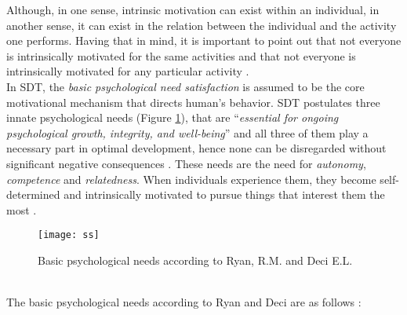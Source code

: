 Although, in one sense, intrinsic motivation can exist within an individual, in another sense, it can exist in the relation between the individual and the activity one performs. Having that in mind, it is important to point out that not everyone is intrinsically motivated for the same activities and that not everyone is intrinsically motivated for any particular activity \cite{ryan2000intrinsic}. \\In SDT, the \textit{basic psychological need satisfaction} is assumed to be the core motivational mechanism that directs human's behavior. SDT postulates three innate psychological needs (Figure \ref{fig:ss}), that are ``\textit{essential for ongoing psychological growth, integrity, and well-being}'' and all three of them play a necessary part in optimal development, hence none can be disregarded without significant negative consequences \cite{deci2000and}. These needs are the need for \textit{autonomy}, \textit{competence} and \textit{relatedness}. When individuals experience them, they become self-determined and intrinsically motivated to pursue things that interest them the most \cite{deci2000and}.\\
\begin{figure}[h]
    \centering
    \texttt{[image: ss]}
    \caption{Basic psychological needs according to Ryan, R.M. and Deci E.L. \cite{deci1994promoting} }
    \label{fig:ss}
\end{figure}\\
The basic psychological needs according to Ryan and Deci are as follows \cite{deci1994promoting}:
